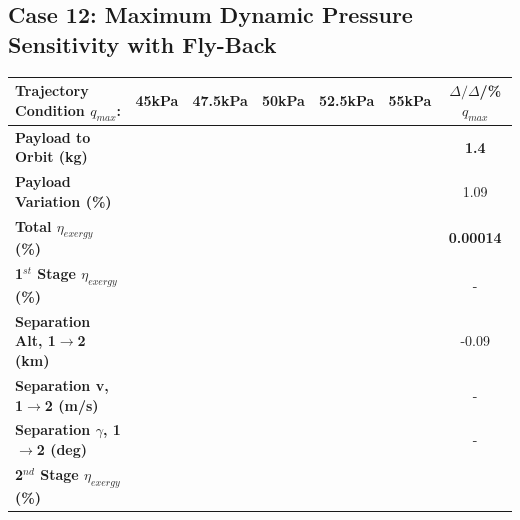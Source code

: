 \subsection{Case 12: Maximum Dynamic Pressure Sensitivity with Fly-Back}
\begin{table}[ht]%
	\centering
	\begin{tabular}{l c c c c c c} 
		\hline \textbf{Trajectory Condition}   \qquad  $q_{max}$:
		&45kPa
		&47.5kPa
		&50kPa
		&52.5kPa
		&55kPa
		& $\Delta/\Delta$/\%$q_{max}$
		\\
		\hline \textbf{Payload to Orbit (kg)}
		& \textbf{\PayloadToOrbitqForty}
		& \textbf{\PayloadToOrbitqFortyFive}
		& \textbf{\PayloadToOrbitqStandard}
		& \textbf{\PayloadToOrbitqFiftyFive}
		& \textbf{\PayloadToOrbitqSixty}
		&\textbf{1.4}
		\\
		\textbf{Payload Variation (\%)}
		& \PayloadVarqForty
		& \PayloadVarqFortyFive
		& \PayloadVarqStandard
		& \PayloadVarqFiftyFive
		& \PayloadVarqSixty
		&1.09
		\\
		\textbf{Total $\eta_{exergy}$ (\%)}
		& \textbf{\totalExergyEffqForty}
		& \textbf{\totalExergyEffqFortyFive}
		& \textbf{\totalExergyEffqStandard}
		& \textbf{\totalExergyEffqFiftyFive}
		& \textbf{\totalExergyEffqSixty}
		& \textbf{0.00014}
		\\
		\hline 
		\textbf{1$^{st}$ Stage $\eta_{exergy}$ (\%)}
		& \textbf{\firstExergyEffqForty}
		& \textbf{\firstExergyEffqFortyFive}
		& \textbf{\firstExergyEffqStandard}
		& \textbf{\firstExergyEffqFiftyFive}
		& \textbf{\firstExergyEffqSixty}
		& -
		\\
		\textbf{Separation Alt, 1$\rightarrow$2 (km)}
		& \firstsecondSeparationAltqForty
		& \firstsecondSeparationAltqFortyFive
		& \firstsecondSeparationAltqStandard
		& \firstsecondSeparationAltqFiftyFive
		& \firstsecondSeparationAltqSixty
		&-0.09
		\\
		\textbf{Separation v, 1$\rightarrow$2 (m/s)}
		& \firstsecondSeparationvqForty
		& \firstsecondSeparationvqFortyFive
		& \firstsecondSeparationvqStandard
		& \firstsecondSeparationvqFiftyFive
		& \firstsecondSeparationvqSixty
		& -
		\\
		\textbf{Separation $\gamma$, 1$\rightarrow$2 (deg)}
		& \firstsecondSeparationgammaqForty
		& \firstsecondSeparationgammaqFortyFive
		& \firstsecondSeparationgammaqStandard
		& \firstsecondSeparationgammaqFiftyFive
		& \firstsecondSeparationgammaqSixty
		& -
		\\
		\hline 
		\textbf{2$^{nd}$ Stage $\eta_{exergy}$ (\%)}
		& \textbf{\secondExergyEffqForty}

\end{tabular}
\end{table}
